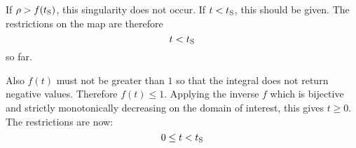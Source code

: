 If $\rho > f(t_\text S)$, this singularity does not occur. If $t < t_\text S$, this should
be given. The restrictions on the map are therefore
\[
    t < t_\text S
\]
so far.

Also $f(t)$ must not be greater than $1$ so that the integral does not return
negative values. Therefore $f(t) \leq 1$. Applying the inverse $f$ which is
bijective and strictly monotonically decreasing on the domain of interest, this
gives $t \geq 0$. The restrictions are now:
\[
    0 \leq t < t_\text S
\]


\IfFileExists{\bibliographyfile}{
    \printbibliography
}{}



